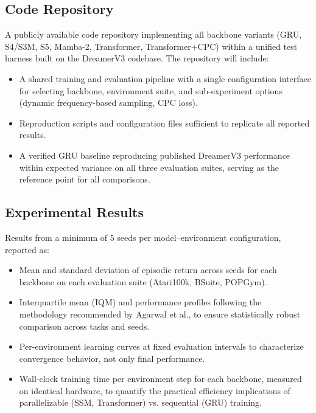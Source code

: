 \documentclass{article}
\begin{document}
\subsection{Code Repository}
A publicly available code repository implementing all backbone variants
(GRU, S4/S3M, S5, Mamba-2, Transformer, Transformer+CPC) within a unified
test harness built on the DreamerV3 codebase. The repository will include:
\begin{itemize}
    \item A shared training and evaluation pipeline with a single
          configuration interface for selecting backbone, environment
          suite, and sub-experiment options (dynamic frequency-based
          sampling, CPC loss).
    \item Reproduction scripts and configuration files sufficient to
          replicate all reported results.
    \item A verified GRU baseline reproducing published DreamerV3
          performance within expected variance on all three evaluation
          suites, serving as the reference point for all comparisons.
\end{itemize}

\subsection{Experimental Results}
Results from a minimum of 5 seeds per model--environment configuration,
reported as:
\begin{itemize}
    \item Mean and standard deviation of episodic return across seeds
          for each backbone on each evaluation suite (Atari100k, BSuite,
          POPGym).
    \item Interquartile mean (IQM) and performance profiles following
          the methodology recommended by Agarwal et al.\cite{rliable},
          to ensure statistically robust comparison across tasks and seeds.
    \item Per-environment learning curves at fixed evaluation intervals
          to characterize convergence behavior, not only final performance.
    \item Wall-clock training time per environment step for each backbone,
          measured on identical hardware, to quantify the practical
          efficiency implications of parallelizable (SSM, Transformer) vs.
          sequential (GRU) training.
\end{itemize}
\end{document}
